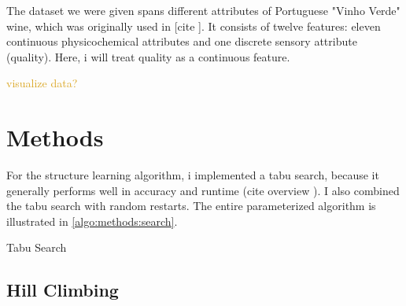 \documentclass[sigconf, fleqn, prologue, dvipsnames]{acmart}
\newcommand{\set}[1]{\{#1\}}
\newcommand{\abs}[1]{\left\vert #1 \right\vert}
\newcommand{\maybe}[1]{%
	\textcolor{Goldenrod}{#1?}
    \reversemarginpar
    \marginpar{\raggedleft\textcolor{Goldenrod}{\rule{2mm}{2mm}}}
}
\def\ndy{
    \reversemarginpar
    \marginpar{\raggedleft\textcolor{red}{\rule{2mm}{2mm}}}
}
\begin{document}
The dataset we were given spans different attributes of Portuguese "Vinho Verde" wine, which was originally used in [cite\ndy].
It consists of twelve features: eleven continuous physicochemical attributes and one discrete sensory attribute (quality).
Here, i will treat quality as a continuous feature.

\maybe{visualize data}
\FloatBarrier


\section{Methods}
For the structure learning algorithm, i implemented a tabu search, because it generally performs well in accuracy and runtime (cite overview \ndy).
I also combined the tabu search with random restarts. The entire parameterized algorithm is illustrated in \autoref{algo:methods:search}.

\begin{algorithm}

	\caption{Tabu Search}
	\label{algo:methods:search}
\end{algorithm}

\ndy


\subsection{Hill Climbing}
\ndy
\end{document}
